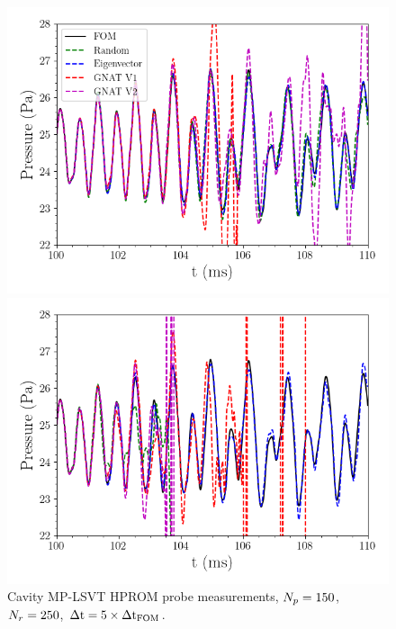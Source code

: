 \begin{figure}
	\begin{minipage}{0.49\linewidth}
		\includegraphics[width=0.99\linewidth]{Chapters/CavityAndCVRC/Images/cavity/deim/pressure_probe_deim_2p5.png}
	\end{minipage}
	\begin{minipage}{0.49\linewidth}
		\includegraphics[width=0.99\linewidth]{Chapters/CavityAndCVRC/Images/cavity/deim/pressure_probe_deim_1.png}
	\end{minipage}
	\caption{\label{fig:cavitySampledROMProbes}Cavity MP-LSVT HPROM probe measurements, $N_p = 150$, $N_r = 250$, $\Delta \text{t} = 5 \times \Delta \text{t}_{\text{FOM}}$.}
\end{figure}

